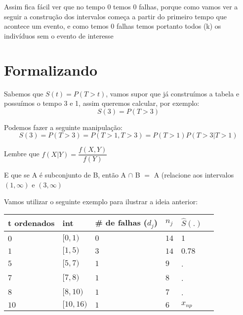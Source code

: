 \documentclass[
  letterpaper,
  DIV=11,
  numbers=noendperiod]{scrreprt}
\begin{document}
Assim fica fácil ver que no tempo 0 temos 0 falhas, porque como vamos
ver a seguir a construção dos intervalos começa a partir do primeiro
tempo que acontece um evento, e como temos 0 falhas temos portanto todos
(k) os indivíduos sem o evento de interesse

\hypertarget{formalizando}{%
\section{Formalizando}\label{formalizando}}

Sabemos que \(S(t) = P(T>t)\), vamos supor que já construímos a tabela e
possuímos o tempo 3 e 1, assim queremos calcular, por exemplo:
\[S(3) = P(T>3)\]

Podemos fazer a seguinte manipulação: \[
S(3) = P(T>3) = P(T>1,T>3) = P(T>1)P(T>3|T>1)
\]

\begin{tcolorbox}[standard jigsaw,opacityback=0, bottomtitle=1mm, titlerule=0mm, rightrule=.15mm, toprule=.15mm, opacitybacktitle=0.6, title=\textcolor{quarto-callout-note-color}{\faInfo}\hspace{0.5em}{Nota}, arc=.35mm, colbacktitle=quarto-callout-note-color!10!white, bottomrule=.15mm, toptitle=1mm, leftrule=.75mm, left=2mm, colframe=quarto-callout-note-color-frame, coltitle=black, colback=white]
Lembre que \(f(X|Y) = \dfrac{f(X,Y)}{f(Y)}\)

E que se A é subconjunto de B, então A \(\cap\) B \(=\) A (relacione aos
intervalos \((1,\infty)\) e \((3,\infty)\)
\end{tcolorbox}

Vamos utilizar o seguinte exemplo para ilustrar a ideia anterior:

\begin{longtable}[]{@{}llllll@{}}
\toprule()
t ordenados & int & \# de falhas (\(d_j\)) & \(n_j\) & \(\hat{S}(.)\)
& \\
\midrule()
\endhead
0 & \([0,1)\) & \(0\) & \(14\) & \(1\) & \\
\(1\) & \([1,5)\) & \(3\) & \(14\) & \(0.78\) & \\
\(5\) & \([5,7)\) & \(1\) & \(9\) & . & \\
\(7\) & \([7,8)\) & \(1\) & \(8\) & . & \\
\(8\) & \([8,10)\) & \(1\) & \(7\) & . & \\
\(10\) & \([10,16)\) & \(1\) & \(6\) & \(x_{np}\) & \\
\bottomrule()
\end{longtable}
\end{document}
